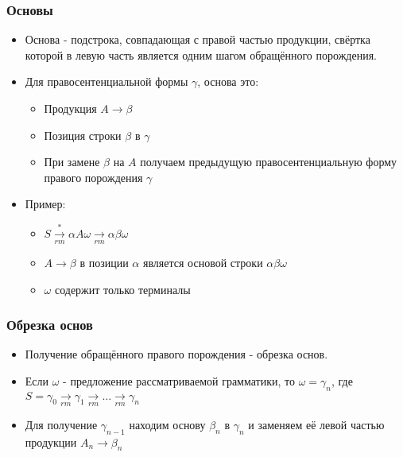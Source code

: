 \documentclass[16pt,pdf,unicode]{beamer}
\begin{document}
\begin{frame}
\frametitle{Основы}
\begin{itemize}
  \item Основа - подстрока, совпадающая с правой частью продукции, свёртка которой в левую часть является одним шагом обращённого порождения.
  \item Для правосентенциальной формы $\gamma$, основа это:
  \begin{itemize}
    \item Продукция $A \rightarrow \beta$
    \item Позиция строки $\beta$ в $\gamma$
    \item При замене $\beta$ на $A$ получаем предыдущую правосентенциальную форму правого порождения $\gamma$
  \end{itemize}
  \item Пример:
    \begin{itemize}
      \item $S \xrightarrow[rm]{*} \alpha A \omega \xrightarrow[rm]{} \alpha \beta \omega$
      \item $A \rightarrow \beta$  в позиции $\alpha$ является основой строки $\alpha \beta \omega$
      \item $\omega$ содержит только терминалы
    \end{itemize}
\end{itemize}
\end{frame}

\begin{frame}
\frametitle{Обрезка основ}
\begin{itemize}
  \item Получение  обращённого правого порождения - обрезка основ.
  \item Если $\omega$ - предложение рассматриваемой грамматики, то $\omega = \gamma_n$, где $S = \gamma_0 \xrightarrow[rm]{} \gamma_1 \xrightarrow[rm]{} \dots \xrightarrow[rm]{} \gamma_n$
  \item Для получение $\gamma_{n-1}$ находим основу $\beta_n$ в $\gamma_n$ и заменяем её левой частью продукции $A_n \rightarrow \beta_n$ 
\end{itemize}
\end{frame}
\end{document}
